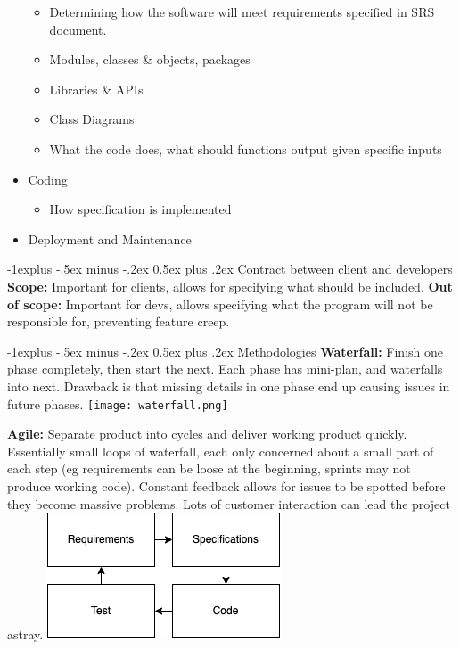 \documentclass[letterpaper, 8pt]{extarticle}
\makeatletter
\renewcommand{\subsection}{\@startsection{subsection}{2}{0mm}%
                                {-1explus -.5ex minus -.2ex}%
                                {0.5ex plus .2ex}%
                                {\normalfont\small\bfseries}}
\makeatother
\begin{document}
\begin{multicols*}{6}
\begin{itemize}
          \begin{itemize}
            \item Determining how the software will meet requirements specified in SRS document.
            \item Modules, classes \& objects, packages
            \item Libraries \& APIs
            \item Class Diagrams
            \item What the code does, what should functions output given specific inputs
          \end{itemize}
    \item Coding
          \begin{itemize}
            \item How specification is implemented
          \end{itemize}
    \item Deployment and Maintenance
  \end{itemize}
  \subsection{Contract between client and developers}
  \textbf{Scope:} Important for clients, allows for specifying what should be included.
  \textbf{Out of scope:} Important for devs,
  allows specifying what the program will not be responsible for,
  preventing feature creep.

  \subsection{Methodologies}
  \textbf{Waterfall:} Finish one phase completely, then start the next.
  Each phase has mini-plan, and waterfalls into next.
  Drawback is that missing details in one phase
  end up causing issues in future phases.
  \texttt{[image: waterfall.png]}

  \textbf{Agile:} Separate product into cycles
  and deliver working product quickly.
  Essentially small loops of waterfall,
  each only concerned about a small part of each step
  (eg requirements can be loose at the beginning, sprints may not produce working code).
  Constant feedback allows for issues to be spotted before they become massive problems.
  Lots of customer interaction can lead the project astray.
  \includegraphics[width=0.8\linewidth]{agile.png}


\end{multicols*}
\end{document}
